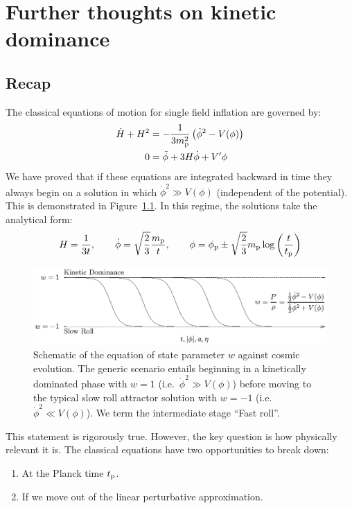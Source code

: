 \chapter{Further thoughts on kinetic dominance}
\label{chap:cls}

\section{Recap}
The classical equations of motion for single field inflation are
governed by:
%
\begin{align}
  \dot{H} + H^2 
  &= - \frac{1}{3m_{\mathrm{p}}^2}\left( \dot{\phi}^2 - V(\phi)\right)
  \label{eqn:raychaudhuri}
  \\
  0 &= \ddot{\phi} + 3H\dot\phi + V^\prime{\phi}
  \label{eqn:kleingordon}
\end{align}
%
We have proved that if these equations are integrated backward in time
they always begin on a solution in which $\dot\phi^2\gg V(\phi)$
(independent of the potential). This is demonstrated in
Figure~\ref{fig:w}. In this regime, the solutions take the analytical
form:
\begin{equation}
  H = \frac{1}{3t},\qquad \dot{\phi} 
  = \sqrt{\frac 2 3}\frac{m_{\mathrm{p}}}{t}, \qquad \phi 
  = \phi_{\mathrm{p}} \pm \sqrt{\frac 2 3}m_{\mathrm{p}} \log\left( \frac t {t_{\mathrm{p}}} \right)
\end{equation}
\begin{figure}
  \includegraphics[width=\textwidth]{chapter_classical_perturbations/plots/w.eps}
  \caption{%
    Schematic of the equation of state parameter $w$ against cosmic
    evolution. The generic scenario entails beginning in a kinetically
    dominated phase with $w=1$ (i.e.\ $\dot{\phi}^2\gg V(\phi)$)
    before moving to the typical slow roll attractor solution with
    $w=-1$ (i.e.\ $\dot{\phi}^2 \ll V(\phi)$). We term the
    intermediate stage ``Fast roll''.\label{fig:w}
  }
\end{figure}

This statement is rigorously true. However, the key question is how
physically relevant it is. The classical equations have two
opportunities to break down:
\begin{enumerate}
  \item At the Planck time $t_{\mathrm{p}}$.
  \item If we move out of the linear perturbative approximation.
\end{enumerate}


